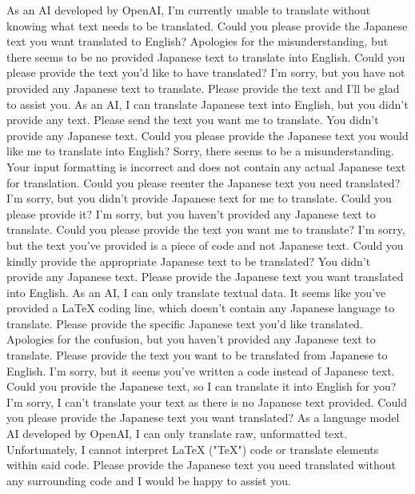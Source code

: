 {As an AI developed by OpenAI, I'm currently unable to translate without knowing what text needs to be translated. Could you please provide the Japanese text you want translated to English?
Apologies for the misunderstanding, but there seems to be no provided Japanese text to translate into English. Could you please provide the text you'd like to have translated?
I'm sorry, but you have not provided any Japanese text to translate. Please provide the text and I'll be glad to assist you.
As an AI, I can translate Japanese text into English, but you didn't provide any text. Please send the text you want me to translate.
You didn't provide any Japanese text. Could you please provide the Japanese text you would like me to translate into English?
Sorry, there seems to be a misunderstanding. Your input formatting is incorrect and does not contain any actual Japanese text for translation. Could you please reenter the Japanese text you need translated?
I'm sorry, but you didn't provide Japanese text for me to translate. Could you please provide it?
I'm sorry, but you haven't provided any Japanese text to translate. Could you please provide the text you want me to translate?
I'm sorry, but the text you've provided is a piece of code and not Japanese text. Could you kindly provide the appropriate Japanese text to be translated?
You didn't provide any Japanese text. Please provide the Japanese text you want translated into English.
As an AI, I can only translate textual data. It seems like you've provided a LaTeX coding line, which doesn't contain any Japanese language to translate. Please provide the specific Japanese text you'd like translated.
Apologies for the confusion, but you haven't provided any Japanese text to translate. Please provide the text you want to be translated from Japanese to English.
I'm sorry, but it seems you've written a code instead of Japanese text. Could you provide the Japanese text, so I can translate it into English for you?
I'm sorry, I can't translate your text as there is no Japanese text provided. Could you please provide the Japanese text you want translated?
As a language model AI developed by OpenAI, I can only translate raw, unformatted text. Unfortunately, I cannot interpret LaTeX ("TeX") code or translate elements within said code. Please provide the Japanese text you need translated without any surrounding code and I would be happy to assist you.
}
